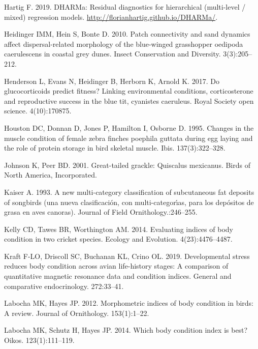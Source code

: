 \documentclass[
]{article}
\begin{document}
\leavevmode\hypertarget{ref-Hartig2019dharma}{}%
Hartig F. 2019. DHARMa: Residual diagnostics for hierarchical
(multi-level / mixed) regression models.
\url{http://florianhartig.github.io/DHARMa/}.

\leavevmode\hypertarget{ref-heidinger2010patch}{}%
Heidinger IMM, Hein S, Bonte D. 2010. Patch connectivity and sand
dynamics affect dispersal-related morphology of the blue-winged
grasshopper oedipoda caerulescens in coastal grey dunes. Insect
Conservation and Diversity. 3(3):205--212.

\leavevmode\hypertarget{ref-henderson2017glucocorticoids}{}%
Henderson L, Evans N, Heidinger B, Herborn K, Arnold K. 2017. Do
glucocorticoids predict fitness? Linking environmental conditions,
corticosterone and reproductive success in the blue tit, cyanistes
caeruleus. Royal Society open science. 4(10):170875.

\leavevmode\hypertarget{ref-houston1995changes}{}%
Houston DC, Donnan D, Jones P, Hamilton I, Osborne D. 1995. Changes in
the muscle condition of female zebra finches poephila guttata during egg
laying and the role of protein storage in bird skeletal muscle. Ibis.
137(3):322--328.

\leavevmode\hypertarget{ref-johnson2001great}{}%
Johnson K, Peer BD. 2001. Great-tailed grackle: Quiscalus mexicanus.
Birds of North America, Incorporated.

\leavevmode\hypertarget{ref-kaiser1993new}{}%
Kaiser A. 1993. A new multi-category classification of subcutaneous fat
deposits of songbirds (una nueva clasificación, con multi-categorı́as,
para los depósitos de grasa en aves canoras). Journal of Field
Ornithology.:246--255.

\leavevmode\hypertarget{ref-kelly2014evaluating}{}%
Kelly CD, Tawes BR, Worthington AM. 2014. Evaluating indices of body
condition in two cricket species. Ecology and Evolution.
4(23):4476--4487.

\leavevmode\hypertarget{ref-kraft2019developmental}{}%
Kraft F-LO, Driscoll SC, Buchanan KL, Crino OL. 2019. Developmental
stress reduces body condition across avian life-history stages: A
comparison of quantitative magnetic resonance data and condition
indices. General and comparative endocrinology. 272:33--41.

\leavevmode\hypertarget{ref-labocha2012morphometric}{}%
Labocha MK, Hayes JP. 2012. Morphometric indices of body condition in
birds: A review. Journal of Ornithology. 153(1):1--22.

\leavevmode\hypertarget{ref-labocha2014body}{}%
Labocha MK, Schutz H, Hayes JP. 2014. Which body condition index is
best? Oikos. 123(1):111--119.
\end{document}
